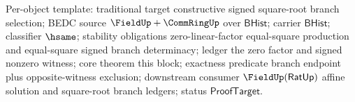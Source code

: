 Per-object template: traditional target constructive signed square-root branch
selection; BEDC source $\FieldUp+\CommRingUp$ over $\mathsf{BHist}$; carrier
$\mathsf{BHist}$; classifier $\hsame$; stability obligations zero-linear-factor
equal-square production and equal-square signed branch determinacy; ledger the
zero factor and signed nonzero witness; core theorem this block; exactness
predicate branch endpoint plus opposite-witness exclusion; downstream consumer
$\FieldUp(\mathsf{RatUp})$ affine solution and square-root branch ledgers;
status $\mathsf{ProofTarget}$.

